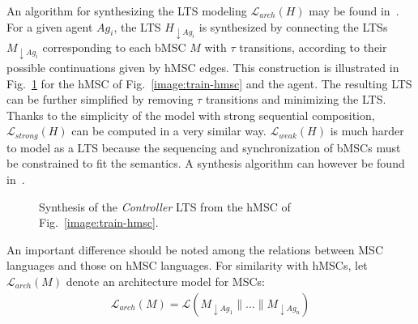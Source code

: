 An algorithm for synthesizing the LTS modeling $\mathcal{L}_{arch}(H)$ may be found in~\cite{Uchitel:2004}. For a given agent $Ag_{i}$, the LTS $H_{\downarrow Ag_i}$ is synthesized by connecting the LTSs $M_{\downarrow Ag_i}$ corresponding to each bMSC $M$ with $\tau$ transitions, according to their possible continuations given by hMSC edges. This construction is illustrated in Fig.~\ref{image:train-controller-synthesis} for the hMSC of Fig.~\ref{image:train-hmsc} and the  agent. The resulting LTS can be further simplified by removing $\tau$ transitions and minimizing the LTS.  Thanks to the simplicity of the model with strong sequential composition, $\mathcal{L}_{strong}(H)$ can be computed in a very similar way. $\mathcal{L}_{weak}(H)$ is much harder to model as a LTS because the sequencing and synchronization of bMSCs must be constrained to fit the semantics. A synthesis algorithm can however be found in~\cite{Uchitel:2004}.

\vspace{0.4cm}
\begin{figure}[H]\centering
{}
\caption{Synthesis of the \emph{Controller} LTS from the hMSC of Fig.~\ref{image:train-hmsc}.\label{image:train-controller-synthesis}}
\end{figure}

An important difference should be noted among the relations between MSC languages and those on hMSC languages. For similarity with hMSCs, let $\mathcal{L}_{arch}(M)$ denote an architecture model for MSCs:
\begin{align}
\mathcal{L}_{arch}(M) = \mathcal{L}(M_{\downarrow Ag_1}\parallel\ldots\parallel M_{\downarrow Ag_n})
\end{align}

